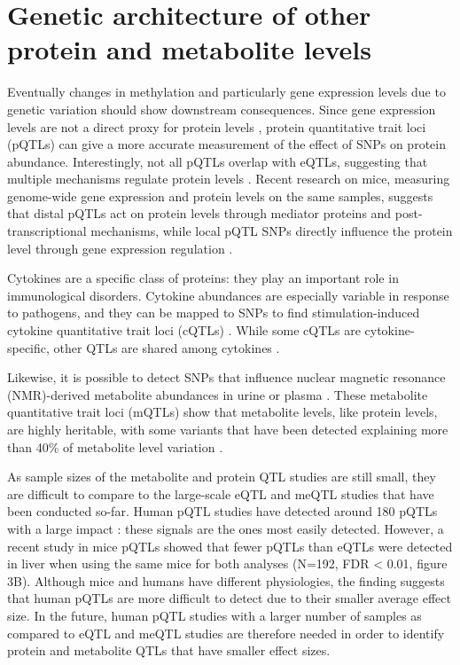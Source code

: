 \section{Genetic architecture of other protein and metabolite levels}
Eventually changes in methylation and particularly gene expression levels due to genetic variation should show downstream consequences. Since gene expression levels are not a direct proxy for protein levels \cite{partsHeritabilityGeneticBasis2014,liuInterdependenceTranscriptProtein2016}, protein quantitative trait loci (pQTLs) can give a more accurate measurement of the effect of SNPs on protein abundance. Interestingly, not all pQTLs overlap with eQTLs, suggesting that multiple mechanisms regulate protein levels \cite{wuVariationGeneticControl2013,liuQuantitativeVariability3422015}. Recent research on mice, measuring genome-wide gene expression and protein levels on the same samples, suggests that distal pQTLs act on protein levels through mediator proteins and post-transcriptional mechanisms, while local pQTL SNPs directly influence the protein level through gene expression regulation \cite{chickDefiningConsequencesGenetic2016}. 

Cytokines are a specific class of proteins: they play an important role in immunological disorders. Cytokine abundances are especially variable in response to pathogens, and they can be mapped to SNPs to find stimulation-induced cytokine quantitative trait loci (cQTLs) \cite{luMappingQuantitativeTrait2011,liInterindividualVariabilityGenetic2016}. While some cQTLs are cytokine-specific, other QTLs are shared among cytokines \cite{liInterindividualVariabilityGenetic2016}.

Likewise, it is possible to detect SNPs that influence nuclear magnetic resonance (NMR)-derived metabolite abundances in urine or plasma \cite{GenomeWideMetabolicQTL,shinAtlasGeneticInfluences2014}. These metabolite quantitative trait loci (mQTLs) show that metabolite levels, like protein levels, are highly heritable, with some variants that have been detected explaining more than 40\% of metabolite level variation \cite{GenomeWideMetabolicQTL}. 

As sample sizes of the metabolite and protein QTL studies are still small, they are difficult to compare to the large-scale eQTL and meQTL studies that have been conducted so-far. Human pQTL studies have detected around 180 pQTLs with a large impact \cite{wuVariationGeneticControl2013}: these signals are the ones most easily detected. However, a recent study in mice pQTLs \cite{chickDefiningConsequencesGenetic2016} showed that fewer pQTLs than eQTLs were detected in liver when using the same mice for both analyses (N=192, FDR < 0.01, figure 3B). Although mice and humans have different physiologies, the finding suggests that human pQTLs are more difficult to detect due to their smaller average effect size. In the future, human pQTL studies with a larger number of samples as compared to eQTL and meQTL studies are therefore needed in order to identify protein and metabolite QTLs that have smaller effect sizes.


